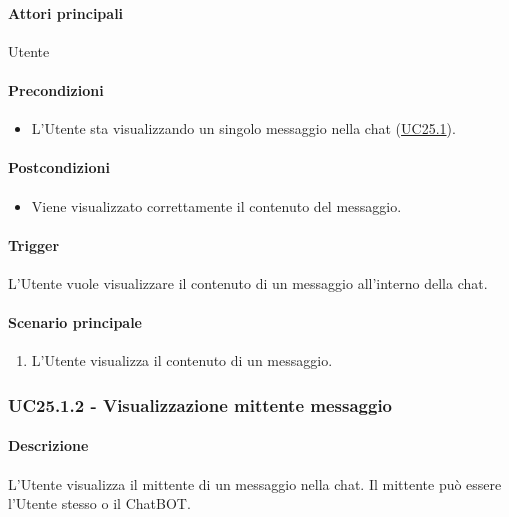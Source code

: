 \paragraph*{Attori principali}
Utente

\paragraph*{Precondizioni}
\begin{itemize}
  \item L'Utente sta visualizzando un singolo messaggio nella chat (\hyperref[UC25point1]{UC25.1}).
\end{itemize}

\paragraph*{Postcondizioni}
\begin{itemize}
  \item Viene visualizzato correttamente il contenuto del messaggio.
\end{itemize}

\paragraph*{Trigger}
L'Utente vuole visualizzare il contenuto di un messaggio all'interno della chat.

\paragraph*{Scenario principale}
\begin{enumerate}
  \item L'Utente visualizza il contenuto di un messaggio.
\end{enumerate}


\subsubsection{UC25.1.2 - Visualizzazione mittente messaggio}\label{UC25point1point2}
\paragraph*{Descrizione}
L'Utente visualizza il mittente di un messaggio nella chat. Il mittente può essere l'Utente stesso o il ChatBOT.

